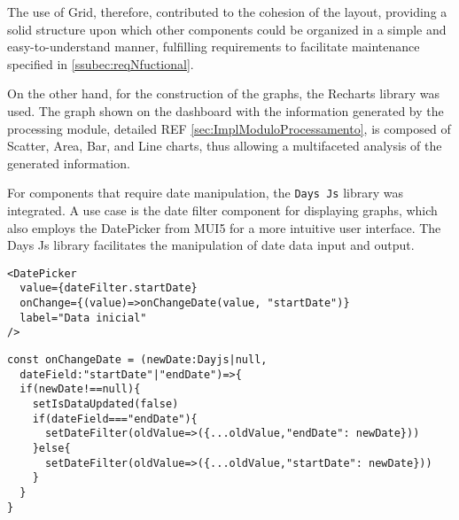 The use of Grid, therefore, contributed to the cohesion of the layout, providing a solid structure upon which other components could be organized in a simple and easy-to-understand manner, fulfilling requirements to facilitate maintenance specified in \ref{ssubec:reqNfuctional}.

On the other hand, for the construction of the graphs, the Recharts library was used. The graph shown on the dashboard with the information generated by the processing module, detailed REF \ref{sec:ImplModuloProcessamento}, is composed of Scatter, Area, Bar, and Line charts, thus allowing a multifaceted analysis of the generated information.

For components that require date manipulation, the \texttt{Days Js} library \cite{dayJsInstallation} was integrated. A use case is the date filter component for displaying graphs, which also employs the DatePicker \cite{muiDatePickerValidation} from \gls{MUI5} for a more intuitive user interface. The Days Js library facilitates the manipulation of date data input and output.

\begin{Verbatim}[fontsize=\small, baselinestretch=0.8]
<DatePicker
  value={dateFilter.startDate}
  onChange={(value)=>onChangeDate(value, "startDate")}
  label="Data inicial"
/>
\end{Verbatim}

\begin{Verbatim}[fontsize=\small, baselinestretch=0.8]
const onChangeDate = (newDate:Dayjs|null, 
  dateField:"startDate"|"endDate")=>{
  if(newDate!==null){
    setIsDataUpdated(false)
    if(dateField==="endDate"){
      setDateFilter(oldValue=>({...oldValue,"endDate": newDate}))
    }else{
      setDateFilter(oldValue=>({...oldValue,"startDate": newDate}))
    }
  }
}
\end{Verbatim}